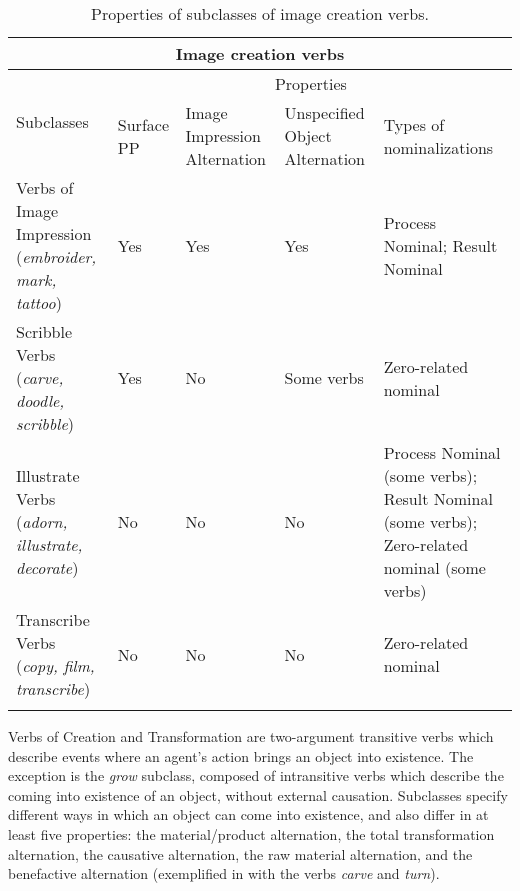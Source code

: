 \documentclass[english]{textolivre}
\begin{document}
\begin{table}[h]
\centering
\begin{threeparttable}
\caption{Properties of subclasses of image creation verbs.}
\label{table10}
\begin{tabular}{*{5}{p{}}}
\toprule
\multicolumn{5}{c}{Image creation verbs} \\
\midrule
\multirow{2}{=}{Subclasses} & \multicolumn{4}{c}{Properties} \\
\arrayrulecolor[gray]{.7}\cmidrule{2-5}\arrayrulecolor{black}
& Surface PP & Image Impression Alternation & Unspecified Object Alternation & Types of nominalizations \\
\midrule
\arrayrulecolor[gray]{.7}
Verbs of Image Impression (\textit{embroider, mark, tattoo}) & Yes & Yes & Yes & Process Nominal; Result Nominal \\
\midrule
Scribble Verbs (\textit{\textit{carve, doodle, scribble}}) & Yes & No & Some verbs & Zero-related nominal \\
\midrule
Illustrate Verbs (\textit{\textit{adorn, illustrate, decorate}}) & No & No & No & Process Nominal (some verbs); Result Nominal (some verbs); Zero-related nominal (some verbs) \\
\midrule
Transcribe Verbs (\textit{\textit{copy, film, transcribe}}) & No & No & No & Zero-related nominal \\
\midrule
\arrayrulecolor{black}
\bottomrule
\end{tabular}
\end{threeparttable}
\end{table}

Verbs of Creation and Transformation are two-argument transitive verbs which describe events where an agent’s action brings an object into existence. The exception is the \textit{grow} subclass, composed of intransitive verbs which describe the coming into existence of an object, without external causation. Subclasses specify different ways in which an object can come into existence, and also differ in at least five properties: the material/product alternation, the total transformation alternation, the causative alternation, the raw material alternation, and the benefactive alternation (exemplified in  with the verbs \textit{carve} and \textit{turn}).
\end{document}
